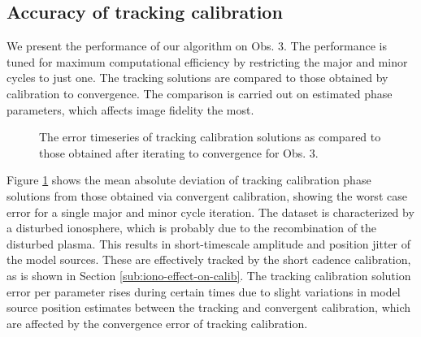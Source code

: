 \documentclass[referee]{aa}
\begin{document}
\subsection{Accuracy of tracking calibration}
We present the performance of our  algorithm on Obs. 3. The performance is tuned
for maximum computational  efficiency by restricting the major  and minor cycles
to  just  one.   The  tracking  solutions  are compared  to  those  obtained  by
calibration to  convergence.  The comparison  is carried out on  estimated phase
parameters, which affects image fidelity the most.
\begin{figure}[tbh]

\caption{\label{fig:The-error-timeseries}The error timeseries of tracking
calibration solutions as compared to those obtained after iterating
to convergence for Obs. 3.}
\end{figure}

Figure  \ref{fig:The-error-timeseries}  shows  the  mean absolute  deviation  of
tracking  calibration  phase  solutions   from  those  obtained  via  convergent
calibration, showing  the worst case  error for a  single major and  minor cycle
iteration.  The  dataset is  characterized by a  disturbed ionosphere,  which is
probably  due to the  recombination of  the disturbed  plasma.  This  results in
\mbox{short-timescale}  amplitude  and position  jitter  of  the model  sources.
These are effectively  tracked by the short cadence calibration,  as is shown in
Section \ref{sub:iono-effect-on-calib}.  The tracking calibration solution error
per  parameter rises  during certain  times due  to slight  variations  in model
source position estimates between the tracking and convergent calibration, which
are affected by the convergence error of tracking calibration.
\end{document}
